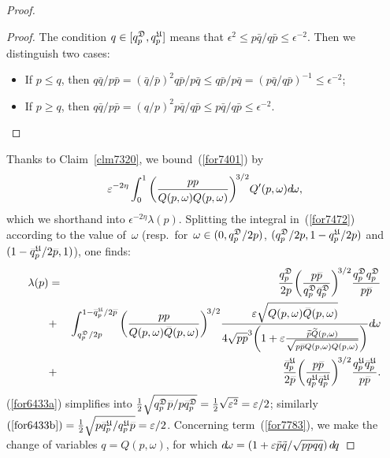 \begin{proof}
\begingroup{}
\begin{proof}
The condition $q\in[q^{\mathfrak{D}}_p,q^{\mathfrak{U}}_p]$ means that
$\epsilon^2 \leq p\bar{q}/q\bar{p} \leq \epsilon^{-2}$.
Then we distinguish two cases:
\begin{itemize}
\item If $p\leq q$, then $q\bar{q}/p\bar{p} = (\bar{q}/\bar{p})^2 q\bar{p}/p\bar{q} \leq q\bar{p}/p\bar{q} = (p\bar{q}/q\bar{p})^{-1} \leq \epsilon^{-2}$;
\item If $p\geq q$, then $q\bar{q}/p\bar{p} = (q/p)^2 p\bar{q}/q\bar{p} \leq p\bar{q}/q\bar{p} \leq \epsilon^{-2}$.
\end{itemize}
\end{proof}\endgroup

\noindent Thanks to Claim~\ref{clm7320}, we bound~(\ref{for7401}) by
\[\label{for7472} \epsilon^{-2\eta} \int_0^1 \bigg(\frac{p\bar{p}}{Q(p,\omega)\bar{Q}(p,\omega)}\bigg)^{\!3/2} Q'(p,\omega) \dx{\omega} ,\]
which we shorthand into $\epsilon^{-2\eta}\lambda(p)$.
Splitting the integral in~(\ref{for7472}) according to the value of~$\omega$
(resp.\ for~$\omega\in(0,q^{\mathfrak{D}}_p/2p)$, $(q^{\mfrak{D}}_p/2p,1-\bar{q}^{\mfrak{U}}_p/2\bar{p})$
and~$(1-\bar{q}^{\mfrak{U}}_p/2\bar{p},1)$), one finds:
%
\begin{eqnarray}
\label{for6433a}
\lambda(p) &=& \frac{q^{\mfrak{D}}_p}{2p} \bigg(\frac{p\bar{p}}{q^{\mfrak{D}}_p\bar{q}^{\mfrak{D}}_p}\bigg)^{\!3/2}
\frac{q^{\mfrak{D}}_p \bar{q}^{\mfrak{D}}_p}{p\bar{p}} \\
\label{for7783}
&+& \int_{q^{\mfrak{D}}_p/2p}^{1-\bar{q}^{\mfrak{U}}_p/2\bar{p}} \bigg(\frac{p\bar{p}}{Q(p,\omega)\bar{Q}(p,\omega)}\bigg)^{\!3/2}
\frac{\epsilon\sqrt{Q(p,\omega)\bar{Q}(p,\omega)}}
{4\sqrt{p\bar{p}}^3 \bigg( 1 + \epsilon \frac{\tilde{p}\tilde{Q}(p,\omega)}{\sqrt{p\bar{p}Q(p,\omega)\bar{Q}(p,\omega)}} \bigg)} \dx{\omega} \\
\label{for6433b}
&+& \frac{\bar{q}^{\mfrak{U}}_p}{2\bar{p}} \bigg(\frac{p\bar{p}}{q^{\mfrak{U}}_p\bar{q}^{\mfrak{U}}_p}\bigg)^{\!3/2}
\frac{q^{\mfrak{U}}_p \bar{q}^{\mfrak{U}}_p}{p\bar{p}}.
\end{eqnarray}
%
(\ref{for6433a}) simplifies into $\frac{1}{2}\sqrt{q^{\mfrak{D}}_p\bar{p}/p\bar{q}^{\mfrak{D}}_p} = \frac{1}{2}\sqrt{\epsilon^2} = \epsilon/2$;
similarly $(\ref{for6433b}) = \frac{1}{2}\sqrt{p\bar{q}^{\mfrak{U}}_p/q^{\mfrak{U}}_p\bar{p}} = \epsilon/2$.
Concerning term~(\ref{for7783}),
we make the change of variables $q = Q(p,\omega)$, for which
$\dx{\omega} = ( 1 + \epsilon \tilde{p}\tilde{q}/\sqrt{p\bar{p}q\bar{q}} ) \,\dx{q}$

\end{proof}
